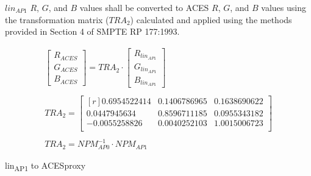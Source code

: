 $lin_{AP1}$ $R$, $G$, and $B$ values shall be converted to ACES $R$, $G$, and $B$ values using the transformation matrix ($TRA_{2}$) calculated and applied using the methods provided in Section 4 of SMPTE RP 177:1993.


\begin{floatequ} 
\begin{gather}
    \begin{bmatrix}
        R_{ACES}\\
        G_{ACES}\\
        B_{ACES}
    \end{bmatrix}
    =
    TRA_{2}
    \cdot
    \begin{bmatrix}
        R_{lin_{AP1}}\\
        G_{lin_{AP1}}\\
        B_{lin_{AP1}}
    \end{bmatrix} \\
    \\
    TRA_{2} =
    \begin{bmatrix*}[r]
        0.6954522414 & 0.1406786965 & 0.1638690622 \\
        0.0447945634 & 0.8596711185 & 0.0955343182 \\
        -0.0055258826 & 0.0040252103 & 1.0015006723 \\
    \end{bmatrix*} \\
    \\
    TRA_{2} = NPM^{-1}_{AP0} \cdot NPM_{AP1}
\end{gather}
\caption{lin\textsubscript{AP1} to ACESproxy}
\label{eq:linAP12ACES12}
\end{floatequ}